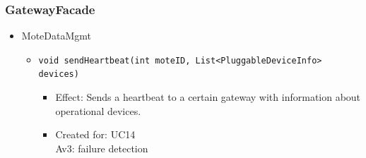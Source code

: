     \subsubsection{GatewayFacade}
        \begin{itemize}
            \item MoteDataMgmt
            \begin{itemize}
                \item \texttt{void sendHeartbeat(int moteID, List<PluggableDeviceInfo> devices)}
                \begin{itemize}
                    \item Effect: Sends a heartbeat to a certain gateway with information about operational devices.
                    \item Created for: UC14 \\
                          Av3: failure detection
                \end{itemize}
            \end{itemize}


\end{itemize}
